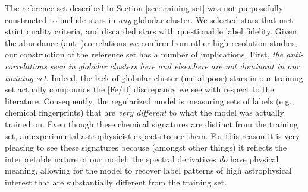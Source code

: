 \documentclass[12pt,preprint]{aastex}
\begin{document}





The reference set described in Section \ref{sec:training-set} was not
purposefully constructed to include stars in \emph{any} globular
cluster.  We selected stars that met strict quality criteria, and
discarded stars with questionable label fidelity.  Given the
abundance (anti-)correlations we confirm from other high-resolution
studies, our construction of the reference set has a number of
implications.  First, \emph{the anti-correlations seen in globular 
clusters here and elsewhere are not dominant in our training set}.
Indeed, the lack of globular cluster (metal-poor) stars in our 
training set actually compounds the [Fe/H] discrepancy we see with
respect to the literature.  Consequently, the regularized model is 
measuring sets of labels (e.g., chemical fingerprints) that are 
\emph{very different} to what the model was actually trained on.  
Even though these chemical signatures are distinct from the training
set, an experimental astrophysicist expects to see them.  For this
reason it is very pleasing to see these signatures because (amongst
other things) it reflects the interpretable nature of our model: the spectral
derivatives \emph{do} have physical meaning, allowing for the model
to recover label patterns of high astrophysical interest that are 
substantially different from the training set.
\end{document}

